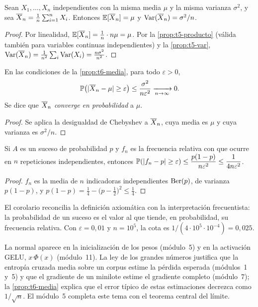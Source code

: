 \begin{proposicion}\label{prop:t6-media}
Sean $X_1,\dots,X_n$ independientes con la misma media $\mu$ y la misma varianza $\sigma^{2}$, y sea $\overline{X}_n=\frac1n\sum_{i=1}^{n}X_i$. Entonces $\mathbb{E}[\overline{X}_n]=\mu$ y $\operatorname{Var}(\overline{X}_n)=\sigma^{2}/n$.
\end{proposicion}

\begin{proof}
Por linealidad, $\mathbb{E}[\overline{X}_n]=\frac1n\cdot n\mu=\mu$. Por la \cref{prop:t5-producto} (válida también para variables continuas independientes) y la \cref{prop:t5-var}, $\operatorname{Var}(\overline{X}_n)=\frac1{n^{2}}\sum_i\operatorname{Var}(X_i)=\frac{n\sigma^{2}}{n^{2}}$.
\end{proof}

\begin{teorema}\label{teo:t6-lgn}
En las condiciones de la \cref{prop:t6-media}, para todo $\varepsilon>0$,
\[
\mathbb{P}\bigl(\lvert\overline{X}_n-\mu\rvert\ge\varepsilon\bigr)\le\frac{\sigma^{2}}{n\varepsilon^{2}}\xrightarrow[n\to\infty]{}0.
\]
Se dice que $\overline{X}_n$ \emph{converge en probabilidad} a $\mu$.
\end{teorema}

\begin{proof}
Se aplica la desigualdad de Chebyshev a $\overline{X}_n$, cuya media es $\mu$ y cuya varianza es $\sigma^{2}/n$.
\end{proof}

\begin{corolario}\label{cor:t6-frecuencias}
Si $A$ es un suceso de probabilidad $p$ y $f_n$ es la frecuencia relativa con que ocurre en $n$ repeticiones independientes, entonces $\mathbb{P}(\lvert f_n-p\rvert\ge\varepsilon)\le\dfrac{p(1-p)}{n\varepsilon^{2}}\le\dfrac{1}{4n\varepsilon^{2}}$.
\end{corolario}

\begin{proof}
$f_n$ es la media de $n$ indicadoras independientes $\operatorname{Ber}(p)$, de varianza $p(1-p)$, y $p(1-p)=\frac14-\bigl(p-\frac12\bigr)^{2}\le\frac14$.
\end{proof}

El corolario reconcilia la definición axiomática con la interpretación frecuentista: la probabilidad de un suceso es el valor al que tiende, en probabilidad, su frecuencia relativa. Con $\varepsilon=0{,}01$ y $n=10^{5}$, la cota es $1/(4\cdot10^{5}\cdot10^{-4})=0{,}025$.

\begin{observacion}
La normal aparece en la inicialización de los pesos (módulo~5) y en la activación GELU, $x\,\Phi(x)$ (módulo~11). La ley de los grandes números justifica que la entropía cruzada media sobre un corpus estime la pérdida esperada (módulos~1 y~5) y que el gradiente de un minilote estime el gradiente completo (módulo~7); la \cref{prop:t6-media} explica que el error típico de estas estimaciones decrezca como $1/\sqrt n$. El módulo~5 completa este tema con el teorema central del límite.
\end{observacion}

